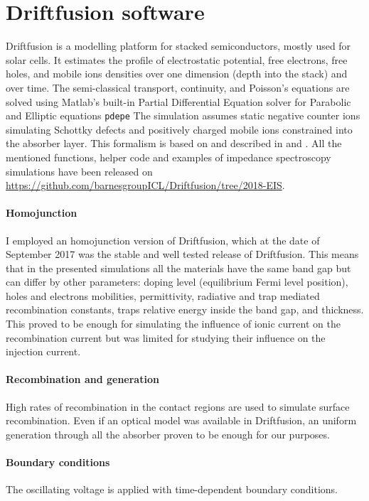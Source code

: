 \section{Driftfusion software}
Driftfusion is a modelling platform for stacked semiconductors, mostly used for solar cells.
It estimates the profile of electrostatic potential, free electrons, free holes, and mobile ions densities over one dimension (depth into the stack) and over time.
The semi-classical transport, continuity, and Poisson's equations are solved using Matlab's built-in Partial Differential Equation solver for Parabolic and Elliptic equations \texttt{pdepe}
The simulation assumes static negative counter ions simulating Schottky defects \cite{Walsh2015} and positively charged mobile ions constrained into the absorber layer.
This formalism is based on  and described in  and .
All the mentioned functions, helper code and examples of impedance spectroscopy simulations have been released on \url{https://github.com/barnesgroupICL/Driftfusion/tree/2018-EIS}.

\paragraph{Homojunction}
I employed an homojunction version of Driftfusion, which at the date of September 2017 was the stable and well tested release of Driftfusion.
This means that in the presented simulations all the materials have the same band gap but can differ by other parameters: doping level (equilibrium Fermi level position), holes and electrons mobilities, permittivity, radiative and trap mediated recombination constants, traps relative energy inside the band gap, and thickness.
This proved to be enough for simulating the influence of ionic current on the recombination current but was limited for studying their influence on the injection current.

\paragraph{Recombination and generation}
High rates of recombination in the contact regions are used to simulate surface recombination.
Even if an optical model was available in Driftfusion, an uniform generation through all the absorber proven to be enough for our purposes.



\paragraph{Boundary conditions}
The oscillating voltage is applied with time\hyp{}dependent boundary conditions.

